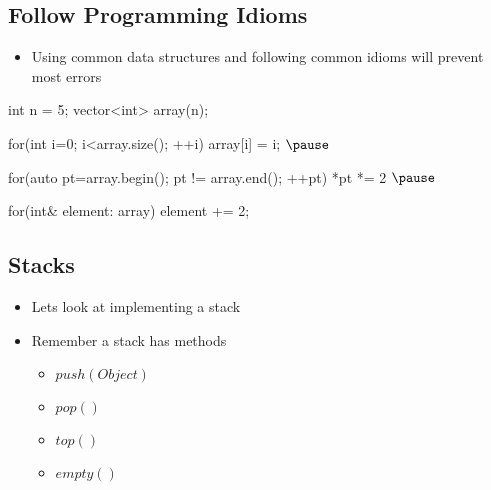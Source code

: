 
\begin{slide}
\section{Follow Programming Idioms}

\begin{PauseHighLight}
  \begin{itemize}
  \item Using common data structures and following common idioms will
    prevent most errors
  \end{itemize}
  \begin{cpp}
    int n = 5;
    vector<int> array(n);
    
    for(int i=0; i<array.size(); ++i) {
      array[i] = i;
    }$\pause$

    for(auto pt=array.begin(); pt != array.end(); ++pt){
      *pt *= 2
    }$\pause$
      
    for(int& element: array) {
      element += 2;
    }
  \end{cpp}\pause

  
\end{PauseHighLight}

\end{slide}


\Outline


\begin{slide}
\section{Stacks}

\begin{PauseHighLight}
  \begin{itemize}
  \item Lets look at implementing a stack\pause
  \item Remember a stack has methods
    \begin{itemize}
    \item \jl$push(Object )$
    \item \jl$pop()$
    \item \jl$top()$
    \item \jl$empty()$\pause
    \end{itemize}
\end{itemize}
\end{PauseHighLight}
\end{slide}

